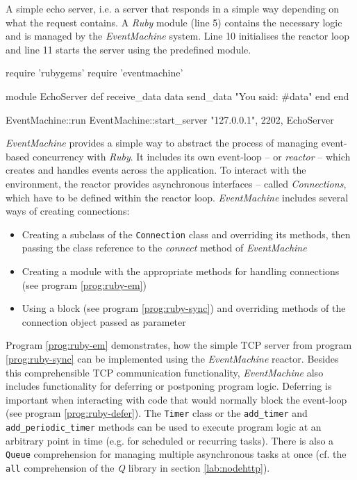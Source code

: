 \begin{program}
  \caption{A simple echo server, i.e. a server that responds in a simple way depending on what the request contains. A \textit{Ruby} module (line 5) contains the necessary logic and is managed by the \textit{EventMachine} system. Line 10 initialises the reactor loop and line 11 starts the server using the predefined module.}
  \label{prog:ruby-em}
  \begin{JavaCode}
require 'rubygems'
require 'eventmachine'

module EchoServer
    def receive_data data
        send_data "You said: #{data}"
    end
end

EventMachine::run {
    EventMachine::start_server "127.0.0.1", 2202, EchoServer
}
  \end{JavaCode}
\end{program}

\textit{EventMachine} provides a simple way to abstract the process of managing event-based concurrency with \textit{Ruby}. It includes its own event-loop -- or \textit{reactor} -- which creates and handles events across the application. To interact with the environment, the reactor provides asynchronous interfaces -- called \textit{Connections}, which have to be defined within the reactor loop. \textit{EventMachine} includes several ways of creating connections:

\begin{itemize}
  \item Creating a subclass of the \texttt{Connection} class and overriding its methods, then passing the class reference to the \textit{connect} method of \textit{EventMachine}
  \item Creating a module with the appropriate methods for handling connections (see program \ref{prog:ruby-em})
  \item Using a block (see program \ref{prog:ruby-sync}) and overriding methods of the connection object passed as parameter
\end{itemize}
Program \ref{prog:ruby-em} demonstrates, how the simple TCP server from program \ref{prog:ruby-sync} can be implemented using the \textit{EventMachine} reactor. Besides this comprehensible TCP communication functionality, \textit{EventMachine} also includes functionality for deferring or postponing program logic. Deferring is important when interacting with code that would normally block the event-loop (see program \ref{prog:ruby-defer}). The \texttt{Timer} class or the \texttt{add\_timer} and \texttt{add\_periodic\_timer} methods can be used to execute program logic at an arbitrary point in time (e.g. for scheduled or recurring tasks). There is also a \texttt{Queue} comprehension for managing multiple asynchronous tasks at once (cf. the \texttt{all} comprehension of the \textit{Q} library in section \ref{lab:nodehttp}). 

